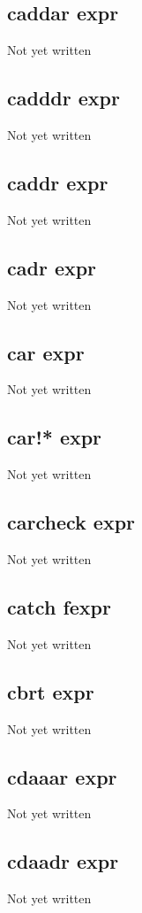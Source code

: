 \documentclass[a4paper,11pt]{article}
\begin{document}
{\subsection{\ttfamily caddar expr}
   Not yet written

\subsection{\ttfamily cadddr expr}
   Not yet written

\subsection{\ttfamily caddr expr}
   Not yet written

\subsection{\ttfamily cadr expr}
   Not yet written

\subsection{\ttfamily car expr}
   Not yet written

\subsection{\ttfamily car!* expr}
   Not yet written

\subsection{\ttfamily carcheck expr}
   Not yet written

\subsection{\ttfamily catch fexpr}
   Not yet written

\subsection{\ttfamily cbrt expr}
   Not yet written

\subsection{\ttfamily cdaaar expr}
   Not yet written

\subsection{\ttfamily cdaadr expr}
   Not yet written

}
\end{document}
